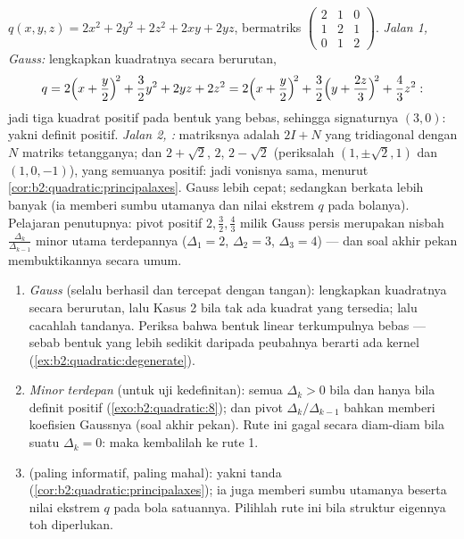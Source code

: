 \begin{example}\label{ex:b2:quadratic:tworoads}
$q(x, y, z) = 2x^2 + 2y^2 + 2z^2 + 2xy + 2yz$, bermatriks
$\begin{pmatrix} 2 & 1 & 0\\ 1 & 2 & 1\\ 0 & 1 & 2
\end{pmatrix}$. \emph{Jalan 1, Gauss:} lengkapkan kuadratnya secara
berurutan,
\[
q = 2\Bigl(x + \frac y2\Bigr)^{\!2} + \frac32 y^2 + 2yz + 2z^2
= 2\Bigl(x + \frac y2\Bigr)^{\!2}
+ \frac32\Bigl(y + \frac{2z}{3}\Bigr)^{\!2} + \frac43 z^2 :
\]
jadi tiga kuadrat positif pada bentuk yang bebas, sehingga signaturnya
$(3, 0)$: yakni definit positif. \emph{Jalan 2, :} matriksnya
adalah $2I + N$ yang tridiagonal dengan $N$ matriks tetangganya; dan
 $2 + \sqrt2$, $2$, $2 - \sqrt2$ (periksalah
 $(1, \pm\sqrt2, 1)$ dan $(1, 0, -1)$), yang semuanya
positif: jadi vonisnya sama, menurut
\cref{cor:b2:quadratic:principalaxes}. Gauss lebih cepat;
sedangkan  berkata lebih banyak (ia memberi sumbu utamanya dan
nilai ekstrem $q$ pada bolanya). Pelajaran penutupnya: pivot
positif $2, \frac32, \frac43$ milik Gauss persis merupakan
nisbah $\frac{\Delta_k}{\Delta_{k-1}}$ minor utama terdepannya
($\Delta_1 = 2$, $\Delta_2 = 3$, $\Delta_3 = 4$) --- dan soal
akhir pekan membuktikannya secara umum.
\end{example}

\begin{method}\label{met:b2:quadratic:signature}
\begin{enumerate}
  \item \emph{Gauss} (selalu berhasil dan tercepat dengan tangan):
        lengkapkan kuadratnya secara berurutan, lalu Kasus 2 bila
        tak ada kuadrat yang tersedia; lalu cacahlah tandanya. Periksa
        bahwa bentuk linear terkumpulnya bebas --- sebab bentuk yang
        lebih sedikit daripada peubahnya berarti ada
        kernel (\cref{ex:b2:quadratic:degenerate}).
  \item \emph{Minor terdepan} (untuk uji kedefinitan): semua
        $\Delta_k > 0$ bila dan hanya bila definit positif
        (\cref{exo:b2:quadratic:8}); dan pivot
        $\Delta_k/\Delta_{k-1}$ bahkan memberi koefisien
        Gaussnya (soal akhir pekan). Rute ini gagal secara diam-diam
        bila suatu $\Delta_k = 0$: maka kembalilah ke rute 1.
  \item \emph{} (paling informatif, paling mahal):
        yakni tanda 
        (\cref{cor:b2:quadratic:principalaxes}); ia juga memberi
        sumbu utamanya beserta nilai ekstrem $q$ pada
        bola satuannya. Pilihlah rute ini bila struktur eigennya
        toh diperlukan.
\end{enumerate}
\end{method}

